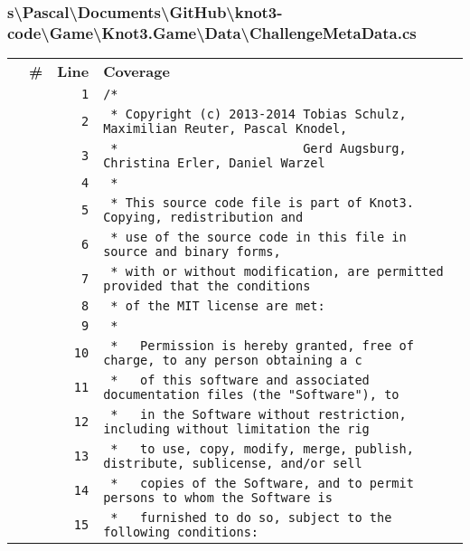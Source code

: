 \documentclass[a4paper,10pt]{article}
\begin{document}
\subsubsection{s\textbackslash Pascal\textbackslash Documents\textbackslash GitHub\textbackslash knot3-code\textbackslash Game\textbackslash Knot3.Game\textbackslash Data\textbackslash ChallengeMetaData.cs}
\begin{longtable}[l]{lrrl}
\textbf{} & \textbf{\#} & \textbf{Line} & \textbf{Coverage}\\
\cellcolor{gray} &  & \verb~1~ & \verb~/*~\\
\cellcolor{gray} &  & \verb~2~ & \verb~ * Copyright (c) 2013-2014 Tobias Schulz, Maximilian Reuter, Pascal Knodel,~\\
\cellcolor{gray} &  & \verb~3~ & \verb~ *                         Gerd Augsburg, Christina Erler, Daniel Warzel~\\
\cellcolor{gray} &  & \verb~4~ & \verb~ *~\\
\cellcolor{gray} &  & \verb~5~ & \verb~ * This source code file is part of Knot3. Copying, redistribution and~\\
\cellcolor{gray} &  & \verb~6~ & \verb~ * use of the source code in this file in source and binary forms,~\\
\cellcolor{gray} &  & \verb~7~ & \verb~ * with or without modification, are permitted provided that the conditions~\\
\cellcolor{gray} &  & \verb~8~ & \verb~ * of the MIT license are met:~\\
\cellcolor{gray} &  & \verb~9~ & \verb~ *~\\
\cellcolor{gray} &  & \verb~10~ & \verb~ *   Permission is hereby granted, free of charge, to any person obtaining a c~\\
\cellcolor{gray} &  & \verb~11~ & \verb~ *   of this software and associated documentation files (the "Software"), to ~\\
\cellcolor{gray} &  & \verb~12~ & \verb~ *   in the Software without restriction, including without limitation the rig~\\
\cellcolor{gray} &  & \verb~13~ & \verb~ *   to use, copy, modify, merge, publish, distribute, sublicense, and/or sell~\\
\cellcolor{gray} &  & \verb~14~ & \verb~ *   copies of the Software, and to permit persons to whom the Software is~\\
\cellcolor{gray} &  & \verb~15~ & \verb~ *   furnished to do so, subject to the following conditions:~\\

\end{longtable}
\end{document}
